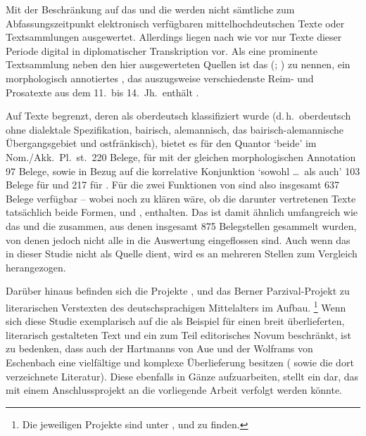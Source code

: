Mit der Beschränkung auf das \CAO{} und die \KC{} werden nicht
sämtliche zum Abfassungszeitpunkt elektronisch verfügbaren
mittelhochdeutschen Texte oder Textsammlungen
ausgewertet. Allerdings liegen nach wie vor nur Texte dieser Periode digital in
diplomatischer Transkription vor. Als eine prominente
Textsammlung neben den hier ausgewerteten Quellen ist das 
(\REM; \cite{rem}) zu nennen, ein morphologisch annotiertes , das
auszugsweise verschiedenste Reim- und Prosatexte aus dem 11.\ bis
14.~Jh.\ enthält \autocite[siehe auch][]{wegera2000}.

Auf Texte begrenzt, deren  als oberdeutsch
klassifiziert wurde (d.\,h.\ oberdeutsch ohne dialektale
Spezifikation, bairisch, alemannisch, das
bai\-risch-alemannische
Übergangsgebiet und ostfränkisch), bietet es
für den Quantor  `beide' im Nom./Akk.~Pl.~st.\ 220 Belege, für
 mit der gleichen morphologischen Annotation 97
Belege, sowie in Bezug auf die korrelative Konjunktion 
`sowohl \dots\ als auch' 103 Belege für  und 217 für .
Für die zwei Funktionen von  sind also insgesamt 637 Belege
verfügbar -- wobei noch zu klären wäre, ob die darunter vertretenen Texte
tatsächlich beide Formen,  und , enthalten. Das \REM{}
ist damit ähnlich umfangreich wie das \CAO{} und die \KC{} zusammen, aus denen
insgesamt 875 Belegstellen gesammelt wurden, von denen jedoch nicht alle in die
Auswertung eingeflossen sind. Auch wenn das \REM{} in dieser Studie nicht als
Quelle dient, wird es an mehreren Stellen zum Vergleich herangezogen.

Darüber hinaus befinden sich die Projekte 
\autocite{iwdigital},  \autocite{ldmdigital} und das
Berner Parzival-Projekt \autocite{parzivalprojekt} zu literarischen Verstexten
des deutschsprachigen Mittelalters im Aufbau.%
%
	\footnote{Die jeweiligen Projekte sind unter ,
	 und  zu finden.}
%
Wenn sich diese Studie exemplarisch auf die \KC{} als Beispiel für einen breit
überlieferten, literarisch gestalteten Text und ein zum Teil editorisches Novum
beschränkt, ist zu bedenken, dass auch der  Hartmanns von
Aue und der  Wolframs von
Eschenbach eine vielfältige und komplexe
Überlieferung besitzen (\cite[vgl.][s.\,v.~\textit{:
}, \textit{: }]{hsc} sowie
die dort verzeichnete Literatur). Diese ebenfalls in Gänze aufzuarbeiten,
stellt ein  dar, das mit einem Anschlussprojekt an die
vorliegende Arbeit verfolgt werden könnte.

